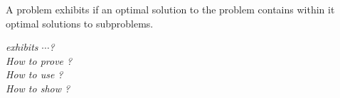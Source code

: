 
\begin{frame}{}
  \begin{definition}
    A problem exhibits \textbf{\emph{}} if
    an optimal solution to the problem contains within it optimal solutions to subproblems.
  \end{definition}

  \pause
  \vspace{0.30cm}
  \begin{center}
    {\it {} exhibits $\cdots$?} \\[8pt]
    {\it How to prove ?} \\[8pt]
    {\it How to use ?} \\[8pt]
    {\it How to show ?}  \\[30pt]

    \pause
  \end{center}
\end{frame}
